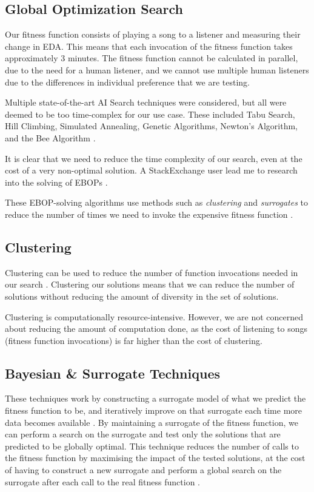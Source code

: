\documentclass{article}
\begin{document}
	\subsection{Global Optimization Search}
	Our fitness function consists of playing a song to a listener and measuring their change in EDA. This means that each invocation of the fitness function takes approximately 3 minutes. The fitness function cannot be calculated in parallel, due to the need for a human listener, and we cannot use multiple human listeners due to the differences in individual preference that we are testing.
	
	Multiple state-of-the-art AI Search techniques were considered, but all were deemed to be too time-complex for our use case. These included Tabu Search, Hill Climbing, Simulated Annealing, Genetic Algorithms, Newton's Algorithm, and the Bee Algorithm \cite{chandel_searching_2014, pham_bee_2005}.
	
	It is clear that we need to reduce the time complexity of our search, even at the cost of a very non-optimal solution. A StackExchange user lead me to research into the solving of EBOPs \cite{stackexchange_search_2018}.
	
	These EBOP-solving algorithms use methods such as \emph{clustering} and \emph{surrogates} to reduce the number of times we need to invoke the expensive fitness function \cite{boukouvala_derivative-free_2014, jones_efficient_1998, dong_surrogate-based_2018}.
	
	\subsection{Clustering}
	Clustering can be used to reduce the number of function invocations needed in our search \cite{boukouvala_derivative-free_2014, wang_time_2017}. Clustering our solutions means that we can reduce the number of solutions without reducing the amount of diversity in the set of solutions.
	
	Clustering is computationally resource-intensive. However, we are not concerned about reducing the amount of computation done, as the cost of listening to songs (fitness function invocations) is far higher than the cost of clustering.
	
	\subsection{Bayesian \& Surrogate Techniques}
	These techniques work by constructing a surrogate model of what we predict the fitness function to be, and iteratively improve on that surrogate each time more data becomes available \cite{mockus_optimization_nodate, dong_surrogate-based_2018}. By maintaining a surrogate of the fitness function, we can perform a search on the surrogate and test only the solutions that are predicted to be globally optimal. This technique reduces the number of calls to the fitness function by maximising the impact of the tested solutions, at the cost of having to construct a new surrogate and perform a global search on the surrogate after each call to the real fitness function \cite{boukouvala_derivative-free_2014}.
	
\end{document}
